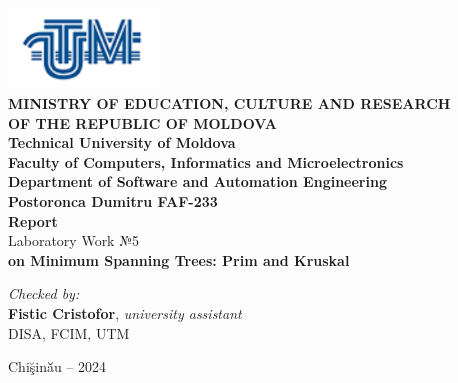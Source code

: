 \documentclass[12pt]{article}
\begin{document}
\begin{titlepage}
\begin{center}
    \includegraphics[width=0.3\textwidth]{image.png} \\[0.2cm]
    
    \textbf{MINISTRY OF EDUCATION, CULTURE AND RESEARCH \\
    OF THE REPUBLIC OF MOLDOVA} \\[0.3cm]
    
    \textbf{Technical University of Moldova \\
    Faculty of Computers, Informatics and Microelectronics \\
    Department of Software and Automation Engineering} \\[2cm]
    
    \textbf{Postoronca Dumitru FAF-233}\\[0.5cm]
    
    \Huge \textbf{Report} \\[0.5cm]
    
    \large Laboratory Work №5\\[0.5cm]
    
    \textbf{on Minimum Spanning Trees: Prim and Kruskal} \\[3cm]
    
    \begin{flushright}
        \textit{Checked by:} \\
        \textbf{Fistic Cristofor}, \textit{university assistant} \\
        DISA, FCIM, UTM
    \end{flushright}
    
    \vfill
    
    Chi\u{\c{s}}in\u{\u{a}}u -- 2024
\end{center}
\end{titlepage}

\newpage
\setcounter{page}{1}
\pagestyle{fancy}
\fancyhf{}
\rhead{\thepage}
\end{document}

